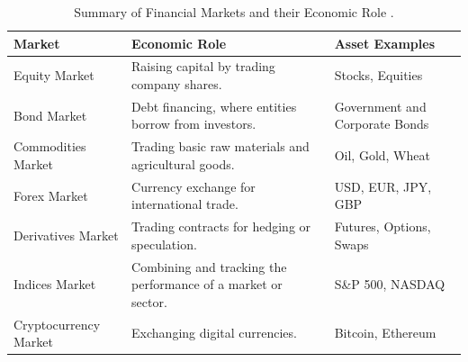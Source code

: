 \begin{table}[htb!]
\centering
\footnotesize
\caption{Summary of Financial Markets and their Economic Role \cite{brandimarte_introduction_2018}.}
\label{Tables:FinancialMarkets}
\begin{tabularx}{\textwidth}{@{}lXl@{}}
\toprule
\textbf{Market} & \textbf{Economic Role} & \textbf{Asset Examples} \\
\midrule
Equity Market & Raising capital by trading company shares. & Stocks, Equities \\
\addlinespace
Bond Market & Debt financing, where entities borrow from investors. & Government and Corporate Bonds \\
\addlinespace
Commodities Market & Trading basic raw materials and agricultural goods. & Oil, Gold, Wheat \\
\addlinespace
Forex Market & Currency exchange for international trade. & USD, EUR, JPY, GBP \\
\addlinespace
Derivatives Market & Trading contracts for hedging or speculation. & Futures, Options, Swaps \\
\addlinespace
Indices Market & Combining and tracking the performance of a market or sector. & S\&P 500, NASDAQ \\
\addlinespace
Cryptocurrency Market & Exchanging digital currencies. & Bitcoin, Ethereum \\
\bottomrule
\end{tabularx}
\end{table}